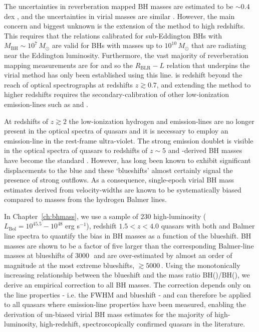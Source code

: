 The uncertainties in reverberation mapped BH masses are estimated to be $\sim 0.4$\,dex \citep[e.g.][]{peterson10}, and the uncertainties in virial masses are similar \citep[e.g.][]{vestergaard06}.
However, the main concern and biggest unknown is the extension of the method to high redshifts. 
This requires that the relations calibrated for sub-Eddington BHs with $M_{\text{BH}}\sim10^7\,M_\odot$ are valid for BHs with masses up to $10^{10}\,M_\odot$ that are radiating near the Eddington luminosity. 
Furthermore, the vast majority of reverberation mapping measurements are for \hb and so the $R_{\text{BLR}}-L$ relation that underpins the virial method has only been established using this line.
\hb is redshift beyond the reach of optical spectrographs at redshifts $z \gtrsim 0.7$, and extending the method to higher redshifts requires the secondary-calibration of other low-ionization emission-lines such as \ha and  \citep[e.g.][]{vestergaard02,mclure02,wu04,kollmeier06,onken08,wang09,rafiee11}.

At redshifts of $z\gtrsim 2$ the low-ionization hydrogen and  emission-lines are no longer present in the optical spectra of quasars and it is necessary to employ an emission-line in the rest-frame ultra-violet.  
The strong  emission doublet is visible in the optical spectra of quasars to redshifts of $z\sim5$ and -derived BH masses have become the standard \citep[e.g.][]{vestergaard06,park13}.
However,  has long been known to exhibit significant displacements to the blue and these `blueshifts' almost certainly signal the presence of strong outflows.
As a consequence, single-epoch virial BH mass estimates derived from  velocity-widths are known to be systematically biased compared to masses from the hydrogen Balmer lines. 

In Chapter~\ref{ch:bhmass}, we use a sample of $230$ high-luminosity ($L_{\text{Bol}} = 10^{45.5}-10^{48}$ erg s$^{-1}$), redshift $1.5 < z < 4.0$ quasars with both  and Balmer line spectra to quantify the bias in  BH masses as a function of the  blueshift. 
 BH masses are shown to be a factor of five larger than the corresponding Balmer-line masses at  blueshifts of $3000$\,\kms\, and are over-estimated by almost an order of magnitude at the most extreme blueshifts, $\gtrsim 5000$\,\kms.
Using the monotonically increasing relationship between the  blueshift and the mass ratio BH()/BH(\hans), we derive an empirical correction to all  BH masses.
The correction depends only on the  line properties - i.e. the FWHM and blueshift - and can therefore be applied to all quasars where  emission-line properties have been measured, enabling the derivation of un-biased virial BH mass estimates for the majority of high-luminosity, high-redshift, spectroscopically confirmed quasars in the literature.

